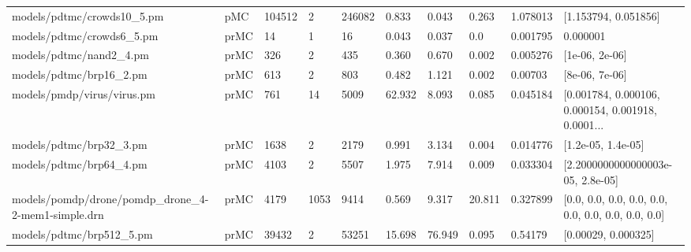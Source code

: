 \begin{tabular}{llllllllll}
                        models/pdtmc/crowds10\_5.pm &  pMC & 104512 &          2 &      246082 &          0.833 &            0.043 &                        0.263 &       1.078013 &                               [1.153794, 0.051856] \\
                         models/pdtmc/crowds6\_5.pm & prMC &     14 &          1 &          16 &          0.043 &            0.037 &                          0.0 &       0.001795 &                                           0.000001 \\
                           models/pdtmc/nand2\_4.pm & prMC &    326 &          2 &         435 &          0.360 &            0.670 &                        0.002 &       0.005276 &                                     [1e-06, 2e-06] \\
                           models/pdtmc/brp16\_2.pm & prMC &    613 &          2 &         803 &          0.482 &            1.121 &                        0.002 &        0.00703 &                                     [8e-06, 7e-06] \\
                        models/pmdp/virus/virus.pm & prMC &    761 &         14 &        5009 &         62.932 &            8.093 &                        0.085 &       0.045184 & [0.001784, 0.000106, 0.000154, 0.001918, 0.0001... \\
                           models/pdtmc/brp32\_3.pm & prMC &   1638 &          2 &        2179 &          0.991 &            3.134 &                        0.004 &       0.014776 &                                 [1.2e-05, 1.4e-05] \\
                           models/pdtmc/brp64\_4.pm & prMC &   4103 &          2 &        5507 &          1.975 &            7.914 &                        0.009 &       0.033304 &                  [2.2000000000000003e-05, 2.8e-05] \\
models/pomdp/drone/pomdp\_drone\_4-2-mem1-simple.drn & prMC &   4179 &       1053 &        9414 &          0.569 &            9.317 &                       20.811 &       0.327899 & [0.0, 0.0, 0.0, 0.0, 0.0, 0.0, 0.0, 0.0, 0.0, 0.0] \\
                          models/pdtmc/brp512\_5.pm & prMC &  39432 &          2 &       53251 &         15.698 &           76.949 &                        0.095 &        0.54179 &                                [0.00029, 0.000325] \\
\bottomrule
\end{tabular}
